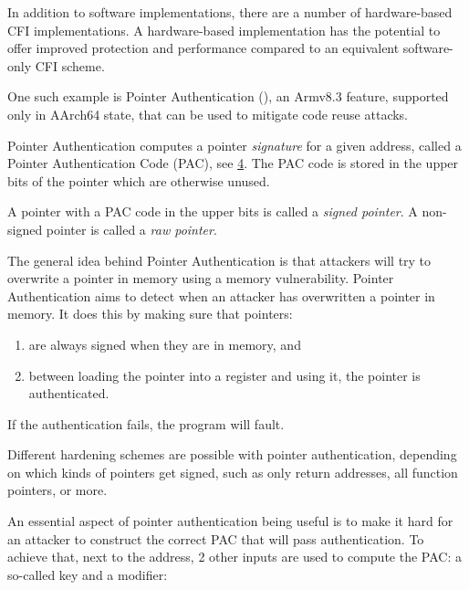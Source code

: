 \documentclass[
  a4paper,
]{report}
\providecommand{\tightlist}{%
  \setlength{\itemsep}{0pt}\setlength{\parskip}{0pt}}
\begin{document}
In addition to software implementations, there are a number of
hardware-based CFI implementations. A hardware-based implementation has
the potential to offer improved protection and performance compared to
an equivalent software-only CFI scheme.

One such example is Pointer Authentication
(), an Armv8.3 feature,
supported only in AArch64 state, that can be used to mitigate code reuse
attacks.

Pointer Authentication computes a pointer \emph{signature} for a given
address, called a Pointer Authentication Code
(PAC), see \hyperref[fig:pauth-sign-auth]{4}. The PAC code is stored in
the upper bits of the pointer which are otherwise unused.

A pointer with a PAC code in the upper bits is called a \emph{signed
pointer}. A non-signed pointer is called a
\emph{raw pointer}.

The general idea behind Pointer Authentication is that attackers will
try to overwrite a pointer in memory using a memory vulnerability.
Pointer Authentication aims to detect when an attacker has overwritten a
pointer in memory. It does this by making sure that pointers:

\begin{enumerate}
\def\labelenumi{\arabic{enumi}.}
\tightlist
\item
  are always signed when they are in memory, and
\item
  between loading the pointer into a register and using it, the pointer
  is authenticated.
\end{enumerate}

If the authentication fails, the program will fault.

Different hardening schemes are possible with pointer authentication,
depending on which kinds of pointers get signed, such as only return
addresses, all function pointers, or more.

An essential aspect of pointer authentication being useful is to make it
hard for an attacker to construct the correct PAC that will pass
authentication. To achieve that, next to the address, 2 other inputs are
used to compute the PAC: a so-called key and a
modifier:
\end{document}
